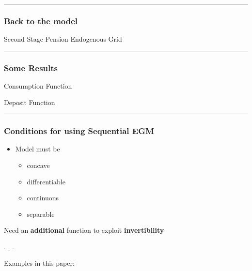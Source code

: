 \documentclass[
  letterpaper,
  DIV=11,
  numbers=noendperiod]{scrartcl}
\providecommand{\tightlist}{%
  \setlength{\itemsep}{0pt}\setlength{\parskip}{0pt}}\usepackage{longtable,booktabs,array}
\begin{document}
\begin{center}\rule{0.5\linewidth}{0.5pt}\end{center}

\hypertarget{back-to-the-model}{%
\subsubsection{Back to the model}\label{back-to-the-model}}

Second Stage Pension Endogenous Grid



\begin{center}\rule{0.5\linewidth}{0.5pt}\end{center}

\hypertarget{some-results}{%
\subsubsection{Some Results}\label{some-results}}

Consumption Function

Deposit Function

\begin{center}\rule{0.5\linewidth}{0.5pt}\end{center}

\hypertarget{conditions-for-using-sequential-egm}{%
\subsubsection{Conditions for using Sequential
EGM}\label{conditions-for-using-sequential-egm}}

\begin{itemize}
\tightlist
\item
  Model must be

  \begin{itemize}
  \tightlist
  \item
    concave
  \item
    differentiable
  \item
    continuous
  \item
    separable
  \end{itemize}
\end{itemize}

Need an \textbf{additional} function to exploit \textbf{invertibility}

. . .

Examples in this paper:
\end{document}
